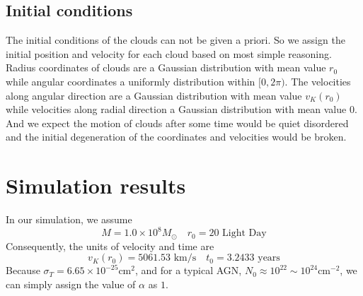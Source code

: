 \documentclass{article}
\begin{document}
\subsection{Initial conditions}
The initial conditions of the clouds can not be given a priori. So we assign the initial position and velocity for each cloud based on most simple reasoning. Radius coordinates of clouds are a Gaussian distribution with mean value $r_0$ while angular coordinates a  uniformly distribution within $[0,2\pi)$. The velocities along angular direction are a Gaussian distribution with mean value $v_K(r_0)$ while velocities along radial direction a Gaussian distribution with mean value $0$. And we expect the motion of clouds after some time would be quiet disordered and the initial degeneration of the coordinates and velocities would be broken.  

\section{Simulation results}
In our simulation, we assume
\[M = 1.0 \times 10^8 M_{\odot} \quad r_0 = 20 \mbox{ Light Day}\]
Consequently, the units of velocity and time are
\[v_K(r_0) = 5061.53 \mbox{ km/s} \quad t_0 = 3.2433 \mbox{ years}\]
Because $\sigma_T =6.65 \times 10^{-25} \mathrm{cm}^{2}$, and for a typical AGN, $N_0 \approx 10^{22} \sim 10^{24} \mathrm{cm}^{-2}$, we can simply assign the value of $\alpha$ as $1$.  
\end{document}
